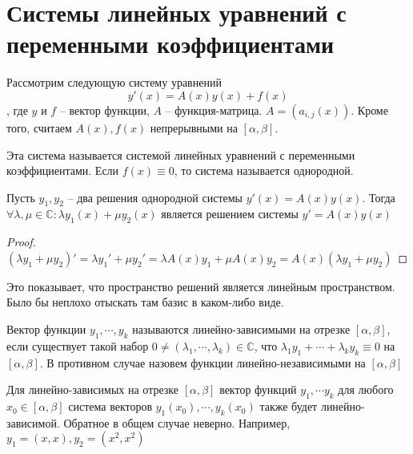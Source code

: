 \documentclass[document.tex]{subfiles}
\begin{document}
\section{Системы линейных уравнений с переменными коэффициентами}
\begin{definition}
    Рассмотрим следующую систему уравнений
    \[
        y'(x) = A(x)y(x) + f(x)
    \],
    где $y$ и $f$ -- вектор функции, $A$ -- функция-матрица. $A = (a_{i, j}(x))$. Кроме того, считаем $A(x), f(x)$
    непрерывными на $[\alpha, \beta]$.

    Эта система называется системой линейных уравнений с переменными коэффициентами. Если $f(x) \equiv 0$, то система
    называется однородной.
\end{definition}

\begin{lemma}
    Пусть $y_1, y_2$ -- два решения однородной системы $y'(x) = A(x)y(x)$. Тогда $\forall \lambda, \mu \in
    \mathbb{C}: \lambda y_1(x) + \mu y_2(x)$ является решением системы $y' = A(x)y(x)$
\end{lemma}

\begin{proof}
    $(\lambda y_1 + \mu y_2)' = \lambda y_1' + \mu y_2' = \lambda A(x) y_1 + \mu A(x) y_2 =  A(x) (\lambda y_1 + \mu
    y_2)$
\end{proof}

\begin{remark}
    Это показывает, что пространство решений является линейным пространством. Было бы неплохо отыскать там базис в
    каком-либо виде.
\end{remark}

\begin{definition}
    Вектор функции $y_1, \cdots, y_k$ называются линейно-зависимыми на отрезке $[\alpha, \beta]$, если существует такой
    набор $0 \neq (\lambda_1, \cdots, \lambda_k) \in \mathbb{C}$, что $\lambda_1 y_1 + \cdots + \lambda_k y_k \equiv 0$
    на $[\alpha, \beta]$. В противном случае назовем функции линейно-независимыми на $[\alpha, \beta]$
\end{definition}

\begin{corollary}
    Для линейно-зависимых на отрезке $[\alpha, \beta]$ вектор функций $y_1, \cdots y_k$ для любого $x_0 \in [\alpha,
    \beta]$ система векторов $y_1(x_0), \cdots, y_k(x_0)$ также будет линейно-зависимой. Обратное в общем случае неверно.
    Например, $y_1 = (x, x), y_2 = (x^2, x^2)$
\end{corollary}
\end{document}
